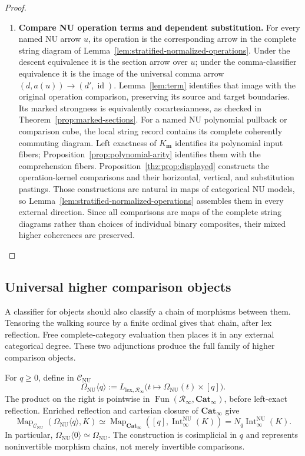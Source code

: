 \documentclass[oneside]{article}
\theoremstyle{plain}
\theoremstyle{definition}
\theoremstyle{remark}
\newcommand{\CNU}{\mathcal C_{\mathrm{NU}}}
\newcommand{\Cat}{\mathbf{Cat}_{\infty}}
\newcommand{\Fun}{\operatorname{Fun}}
\newcommand{\Int}{\operatorname{Int}}
\newcommand{\Map}{\operatorname{Map}}
\newcommand{\NU}{\mathrm{NU}}
\newcommand{\RNU}{\mathcal R_{\infty}}
\newcommand{\id}{\operatorname{id}}
\begin{document}
\begin{proof}
\begin{enumerate}
\item \textbf{Compare NU operation terms and dependent substitution.}
For every named NU arrow $u$, its operation is the corresponding
arrow in the complete string diagram of Lemma~\ref{lem:stratified-normalized-operations}.
Under the descent equivalence it is the section arrow over $u$;
under the comma-classifier equivalence it is the image of the
universal comma arrow
$(d,a(u))\to(d',\id)$.
Lemma~\ref{lem:term} identifies that image with the original
operation comparison, preserving its source and target boundaries.
Its marked strongness is equivalently cocartesianness, as checked in
Theorem~\ref{prop:marked-sections}.
For a named NU polynomial pullback or comparison cube, the local
string record contains its complete coherently commuting diagram.
Left exactness of $K_{\mathbf m}$ identifies its polynomial
input fibers; Proposition~\ref{prop:polynomial-arity} identifies
them with the comprehension fibers.  Proposition~\ref{thz:prop:displayed}
constructs the operation-kernel comparisons and their horizontal,
vertical, and substitution pastings.  Those constructions are natural
in maps of categorical NU models, so Lemma~\ref{lem:stratified-normalized-operations}
assembles them in every external direction.  Since all comparisons
are maps of the complete string diagrams rather than choices of
individual binary composites, their mixed higher coherences are
preserved.\qedhere
\end{enumerate}
\end{proof}

\subsection{Universal higher comparison objects}
\label{subsec:stratified-higher-classifiers}

A classifier for objects should also classify a chain of morphisms
between them. Tensoring the walking source by a finite ordinal gives
that chain, after lex reflection. Free complete-category evaluation then
places it in any external categorical degree. These two adjunctions
produce the full family of higher comparison objects.

For $q\geq0$, define in $\CNU$
\begin{equation}\label{eq:stratified-copower}
 \Omega_{\NU}\langle q\rangle
 :=L_{\mathrm{lex},\RNU}
 \bigl(t\longmapsto\Omega_{\NU}(t)\times[q]\bigr).
\end{equation}
The product on the right is pointwise in $\Fun(\RNU,\Cat)$, before
left-exact reflection.  Enriched reflection and cartesian closure of
$\Cat$ give
\begin{equation}\label{eq:stratified-copower-UP}
 \Map_{\CNU}(\Omega_{\NU}\langle q\rangle,K)
 \simeq
 \Map_{\Cat}([q],\Int^{\NU}_\infty(K))
 =N_q\Int^{\NU}_\infty(K).
\end{equation}
In particular, $\Omega_{\NU}\langle0\rangle\simeq\Omega_{\NU}$.
The construction is cosimplicial in $q$ and represents
noninvertible morphism chains, not merely invertible comparisons.
\end{document}
